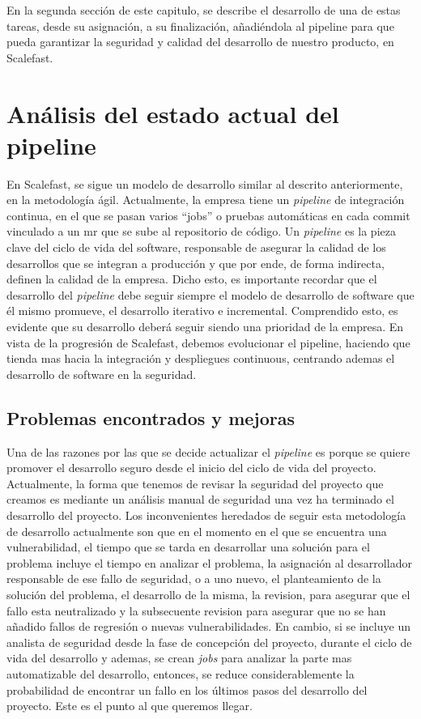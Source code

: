 \documentclass[12pt]{report} %
\begin{document}
En la segunda sección de este capitulo, se describe el desarrollo de una de
estas tareas, desde su asignación, a su finalización, añadiéndola al
\gls{pipeline} para que pueda garantizar la seguridad y calidad del desarrollo
de nuestro producto, en Scalefast.

\section{Análisis del estado actual del pipeline} %

En Scalefast, se sigue un modelo de desarrollo similar al descrito
anteriormente, en la metodología ágil.  Actualmente, la empresa tiene un
\textit{\gls{pipeline}} de integración continua, en el que se pasan varios
``jobs'' o pruebas automáticas en cada commit vinculado a un \acrfull{mr} que se
sube al repositorio de código.  Un \textit{\gls{pipeline}} es la pieza clave del
ciclo de vida del software, responsable de asegurar la calidad de los
desarrollos que se integran a producción y que por ende, de forma indirecta,
definen la calidad de la empresa.  Dicho esto, es importante recordar que el
desarrollo del \textit{\gls{pipeline}} debe seguir siempre el modelo de
desarrollo de software que él mismo promueve, el desarrollo iterativo e
incremental.  Comprendido esto, es evidente que su desarrollo deberá seguir
siendo una prioridad de la empresa.  En vista de la progresión de Scalefast,
debemos evolucionar el pipeline, haciendo que tienda mas hacia la integración y
despliegues continuous, centrando ademas el desarrollo de software en la
seguridad.  

\subsection{Problemas encontrados y mejoras}

Una de las razones por las que se decide actualizar el \textit{\gls{pipeline}}
es porque se quiere promover el desarrollo seguro desde el inicio del ciclo de
vida del proyecto.  Actualmente, la forma que tenemos de revisar la seguridad
del proyecto que creamos es mediante un análisis manual de seguridad una vez ha
terminado el desarrollo del proyecto.  Los inconvenientes heredados de seguir
esta metodología de desarrollo actualmente son que en el momento en el que se
encuentra una vulnerabilidad, el tiempo que se tarda en desarrollar una solución
para el problema incluye el tiempo en analizar el problema, la asignación al
desarrollador responsable de ese fallo de seguridad, o a uno nuevo, el
planteamiento de la solución del problema, el desarrollo de la misma, la
revision, para asegurar que el fallo esta neutralizado y la subsecuente revision
para asegurar que no se han añadido fallos de regresión o nuevas
vulnerabilidades.  En cambio, si se incluye un analista de seguridad desde la
fase de concepción del proyecto, durante el ciclo de vida del desarrollo y
ademas, se crean \textit{\gls{job}s} para analizar la parte mas automatizable
del desarrollo, entonces, se reduce considerablemente la probabilidad de
encontrar un fallo en los últimos pasos del desarrollo del proyecto.  Este es el
punto al que queremos llegar.
\end{document}
